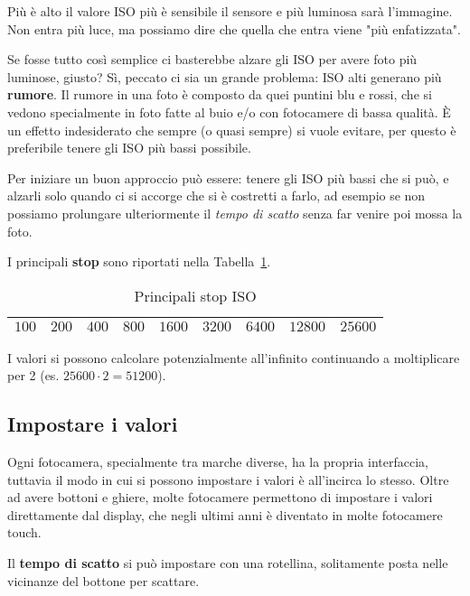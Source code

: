 Più è alto il valore ISO più è sensibile il sensore e più luminosa sarà l'immagine.\\
\nb Non entra più luce, ma possiamo dire che quella che entra viene "più enfatizzata".

Se fosse tutto così semplice ci basterebbe alzare gli ISO per avere foto più luminose, giusto? Sì, peccato ci sia un grande problema: ISO alti generano più \textbf{rumore}.
Il rumore in una foto è composto da quei puntini blu e rossi, che si vedono specialmente in foto fatte al buio e/o con fotocamere di bassa qualità. È un effetto indesiderato che sempre (o quasi sempre) si vuole evitare,
per questo è preferibile tenere gli ISO più bassi possibile.

Per iniziare un buon approccio può essere: tenere gli ISO più bassi che si può, e alzarli solo quando ci si accorge che si è costretti a farlo, ad esempio se non possiamo prolungare ulteriormente il \textit{tempo di scatto} senza far venire poi mossa la foto.

I principali \textbf{stop} sono riportati nella Tabella~\ref{table:stop_ISO}.
\begin{table}[h]
    \centering
    \begin{tabular}{|l|l|l|l|l|l|l|l|l|}
        \hline
        $100$ & $200$ & $400$ & $800$ & $1600$ & $3200$ & $6400$ & $12800$ & $25600$\\
        \hline
    \end{tabular}
    \caption{Principali stop ISO}
    \label{table:stop_ISO}
\end{table}

I valori si possono calcolare potenzialmente all'infinito continuando a moltiplicare per 2 (es. $25600 \cdot 2 = 51200$).



\subsection{Impostare i valori} \label{subsec:setvalori}
Ogni fotocamera, specialmente tra marche diverse, ha la propria interfaccia, tuttavia il modo in cui si possono impostare i valori è all'incirca lo stesso.
Oltre ad avere bottoni e ghiere, molte fotocamere permettono di impostare i valori direttamente dal display, che negli ultimi anni è diventato in molte fotocamere touch.

Il \textbf{tempo di scatto} si può impostare con una rotellina, solitamente posta nelle vicinanze del bottone per scattare.

